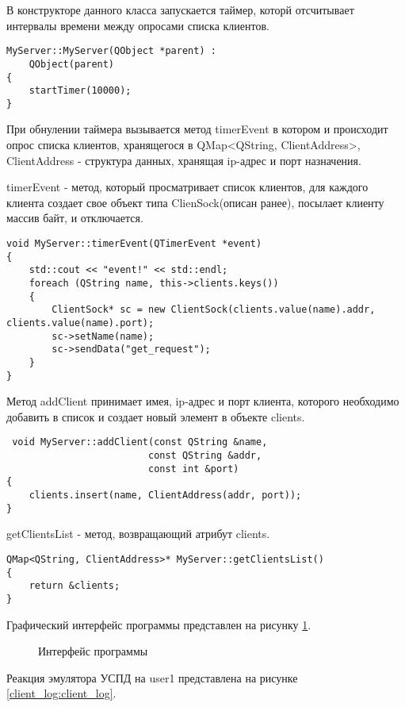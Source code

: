 В конструкторе данного класса запускается таймер, которй отсчитывает интервалы времени между опросами списка клиентов. 

\begin{lstlisting}
MyServer::MyServer(QObject *parent) :
    QObject(parent)
{
    startTimer(10000);
}
\end{lstlisting}

При обнулении таймера вызывается метод timerEvent в котором и происходит опрос списка клиентов, хранящегося в QMap<QString, ClientAddress>, ClientAddress - структура данных, хранящая ip-адрес и порт назначения.

timerEvent - метод, который просматривает список клиентов, для каждого клиента создает свое объект типа ClienSock(описан ранее), посылает клиенту массив байт, и отключается. 

\begin{lstlisting}
void MyServer::timerEvent(QTimerEvent *event)
{
    std::cout << "event!" << std::endl;
    foreach (QString name, this->clients.keys())
    {
        ClientSock* sc = new ClientSock(clients.value(name).addr, clients.value(name).port);
        sc->setName(name);
        sc->sendData("get_request");
    }
}
\end{lstlisting}

Метод addClient принимает имея, ip-адрес и порт клиента, которого необходимо добавить в список и создает новый элемент в объекте clients.

\begin{lstlisting}
 void MyServer::addClient(const QString &name,
                         const QString &addr,
                         const int &port)
{
    clients.insert(name, ClientAddress(addr, port));
}
\end{lstlisting}

getClientsList - метод, возвращающий атрибут clients.

\begin{lstlisting}
QMap<QString, ClientAddress>* MyServer::getClientsList()
{
    return &clients;
}
\end{lstlisting}

Графический интерфейс программы представлен на рисунку \ref{server_gui:server_gui}.

\begin{figure}[ht!]
 \caption{Интерфейс программы}
 \label{server_gui:server_gui}
\end{figure}

\newpage
Реакция эмулятора УСПД на user1 представлена на рисунке \ref{client_log:client_log}.

